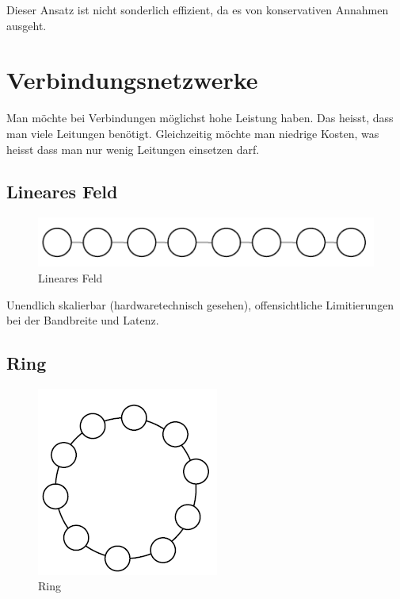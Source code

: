  Dieser Ansatz ist nicht sonderlich effizient, da es von konservativen Annahmen ausgeht.
 
\section{Verbindungsnetzwerke}
Man möchte bei Verbindungen möglichst hohe Leistung haben. Das heisst, dass man viele Leitungen benötigt. Gleichzeitig möchte man niedrige Kosten, was heisst dass man nur wenig Leitungen einsetzen darf.

\subsection{Lineares Feld}

\begin{figure}
\centering
\includegraphics[width=0.7\linewidth]{fig/lineares_feld}
\caption{Lineares Feld}
\label{fig:lineares_feld}
\end{figure}

Unendlich skalierbar (hardwaretechnisch gesehen), offensichtliche Limitierungen bei der Bandbreite und Latenz.

\subsection{Ring}

\begin{figure}
\centering
\includegraphics[width=0.7\linewidth]{fig/ring}
\caption{Ring}
\label{fig:ring}
\end{figure}

